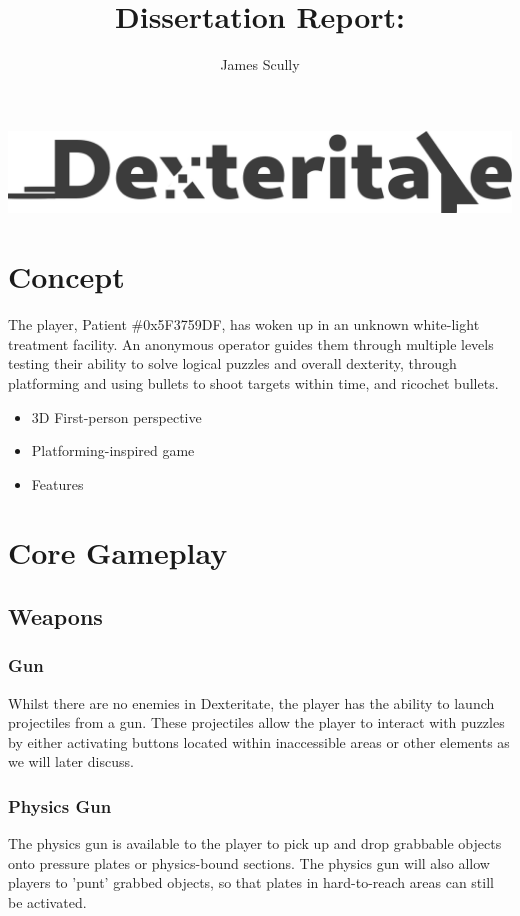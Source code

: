 \documentclass[11pt]{article}
\title{Dissertation Report: \pt}
\author{James Scully}
\begin{document}
\begin{center}
\includegraphics[width=0.75\linewidth]{logo} 
\end{center}

\section*{Concept}
The player, Patient \#0x5F3759DF, has woken up in an unknown white-light treatment facility. An anonymous operator guides them through multiple levels testing their ability to solve logical puzzles and overall dexterity, through platforming and using bullets to shoot targets within time, and ricochet bullets.

\begin{itemize}
	\item 3D First-person perspective 
	\item Platforming-inspired game
	\item Features
\end{itemize}



\section*{Core Gameplay}
\subsection*{Weapons}
\subsubsection*{Gun}
Whilst there are no enemies in Dexteritate, the player has the ability to launch projectiles from a gun. These projectiles allow the player to interact with puzzles by either activating buttons located within inaccessible areas or other elements as we will later discuss.

\subsubsection*{Physics Gun}
The physics gun is available to the player to pick up and drop grabbable objects onto pressure plates or physics-bound sections. The physics gun will also allow players to 'punt' grabbed objects, so that plates in hard-to-reach areas can still be activated.
\end{document}
